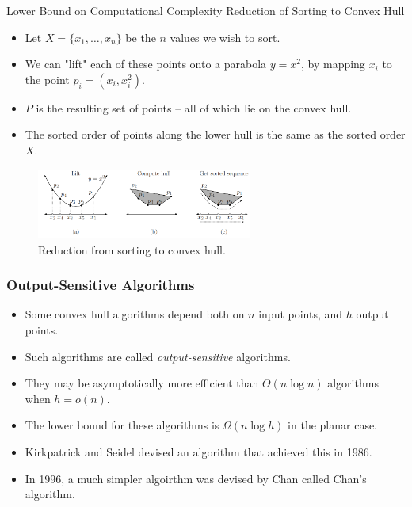 \documentclass{beamer}
\begin{document}
    \begin{frame}[t]{Lower Bound on Computational Complexity}
    {Reduction of Sorting to Convex Hull}
\begin{itemize}
    \item Let $X = \{x_1, \dots, x_n\}$ be the $n$ values we wish to sort.
    \item We can "lift" each of these points onto a parabola $y=x^2$, by mapping $x_i$ to the point 
    $p_i=(x_i,x_i^2)$.
    \item $P$ is the resulting set of points -- all of which lie on the convex hull.
    \item The sorted order of points along the lower hull is the same as the sorted order $X$.
    \end{itemize}    
   \begin{figure}
       \centering
       \includegraphics[width=0.63\textwidth]{lowerbound.png}
       \vspace{-0.75 em}
       \caption{Reduction from sorting to convex hull.}
   \end{figure}
    \end{frame}

    \begin{frame}
      \frametitle{Output-Sensitive Algorithms}
      \begin{itemize}
          \item Some convex hull algorithms depend both on $n$ input points, 
          and $h$ output points. 
          \item Such algorithms are called \textit{output-sensitive} algorithms.
          \item They may be asymptotically more efficient than $\Theta(n\log n)$ algorithms when $h = o(n)$.
          \item The lower bound for these algorithms is $\Omega(n \log h)$ in the planar case. 
          \item Kirkpatrick and Seidel devised an algorithm that achieved this in 1986.
          \item In 1996, a much simpler algoirthm was devised by Chan called Chan's algorithm.
      \end{itemize}
    \end{frame}
\end{document}
